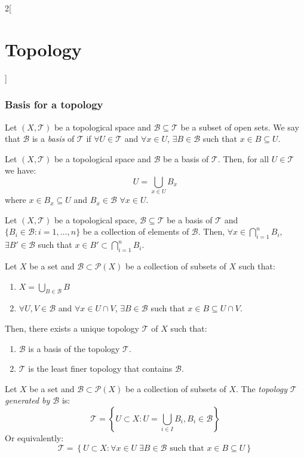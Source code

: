 \documentclass[../../../main.tex]{subfiles}
\begin{document}
\begin{multicols}{2}[\section{Topology}]
  \subsubsection{Basis for a topology}
  \begin{definition}
    Let $(X,\mathcal{T})$ be a topological space and $\mathcal{B}\subseteq\mathcal{T}$ be a subset of open sets. We say that $\mathcal{B}$ is a \textit{basis} of $\mathcal{T}$ if $\forall U\in\mathcal{T}$ and $\forall x\in U$, $\exists B\in\mathcal{B}$ such that $x\in B\subseteq U$.
  \end{definition}
  \begin{prop}
    Let $(X,\mathcal{T})$ be a topological space and $\mathcal{B}$ be a basis of $\mathcal{T}$. Then, for all $U\in\mathcal{T}$ we have: $$U=\bigcup_{x\in U}B_x$$ where $x\in B_x\subseteq U$ and $B_x\in\mathcal{B}$ $\forall x\in U$.
  \end{prop}
  \begin{lemma}
    Let $(X,\mathcal{T})$ be a topological space, $\mathcal{B}\subseteq\mathcal{T}$ be a basis of $\mathcal{T}$ and $\{B_i\in\mathcal{B}:i=1,\ldots,n\}$ be a collection of elements of $\mathcal{B}$. Then, $\forall x\in\bigcap_{i=1}^nB_i$, $\exists B'\in\mathcal{B}$ such that $x\in B'\subset\bigcap_{i=1}^nB_i$.
  \end{lemma}
  \begin{prop}
    Let $X$ be a set and $\mathcal{B}\subset\mathcal{P}(X)$ be a collection of subsets of $X$ such that:
    \begin{enumerate}
      \renewcommand{\labelenumi}{\alph{enumi})}
      \item $\displaystyle X=\bigcup_{B\in\mathcal{B}} B$
      \item $\forall U,V\in\mathcal{B}$ and  $\forall x\in U\cap V$, $\exists B\in\mathcal{B}$ such that $x\in B\subseteq U\cap V$.
    \end{enumerate}
    Then, there exists a unique topology $\mathcal{T}$ of $X$ such that:
    \begin{enumerate}
      \item $\mathcal{B}$ is a basis of the topology $\mathcal{T}$.
      \item $\mathcal{T}$ is the least finer topology that contains $\mathcal{B}$.
    \end{enumerate}
  \end{prop}
  \begin{definition}
    Let $X$ be a set and $\mathcal{B}\subset\mathcal{P}(X)$ be a collection of subsets of $X$. The \textit{topology $\mathcal{T}$ generated by $\mathcal{B}$} is: $$\mathcal{T}=\left\{U\subset X:U=\bigcup_{i\in I}B_i, B_i\in \mathcal{B}\right\}$$ Or equivalently: $$\mathcal{T}=\left\{U\subset X:\forall x\in U\;\exists B\in\mathcal{B}\text{ such that }x\in B\subseteq U\right\}$$

\end{definition}
\end{multicols}
\end{document}
